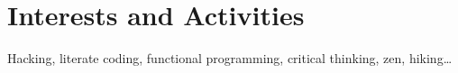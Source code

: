 \documentclass[a4paper,10pt]{article}
\begin{document}
\section{Interests and Activities}
Hacking, literate coding, functional programming, critical thinking, zen, hiking\ldots\\


\end{document}

